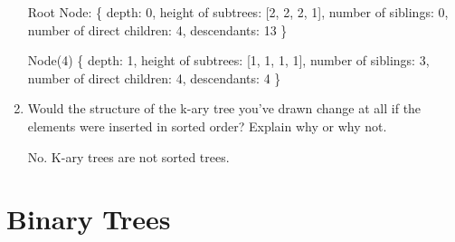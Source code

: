 \documentclass[11pt]{article}
\begin{document}
\begin{enumerate}
        Root Node: \{ depth: 0, height of subtrees: [2, 2, 2, 1], number of siblings: 0, number of direct children: 4, descendants: 13 \}

        Node(4) \{ depth: 1, height of subtrees: [1, 1, 1, 1], number of siblings: 3, number of direct children: 4, descendants: 4 \}
        
        \item Would the structure of the k-ary tree you've drawn change at all if the elements were inserted in sorted order? Explain why or why not.

        No. K-ary trees are not sorted trees.
    \end{enumerate}
    
    \section{Binary Trees}
\end{document}
